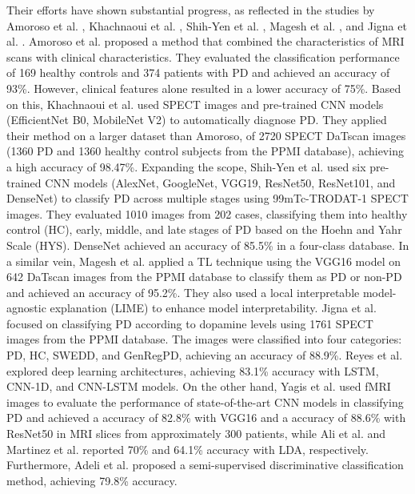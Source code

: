 \documentclass[twocolumn]{article}
\begin{document}
Their efforts have shown substantial progress, as reflected in the studies by Amoroso et al. \cite{amoroso2018complex}, Khachnaoui et al. \cite{khachnaoui2023enhanced}, Shih-Yen et al. \cite{hsu2020classification}, Magesh et al. \cite{magesh2020explainable}, and Jigna et al. \cite{hathaliya2022convolutional}. Amoroso et al. \cite{amoroso2018complex} proposed a method that combined the characteristics of MRI scans with clinical characteristics. They evaluated the classification performance of 169 healthy controls and 374 patients with PD and achieved an accuracy of 93\%. However, clinical features alone resulted in a lower accuracy of 75\%. Based on this, Khachnaoui et al. \cite{khachnaoui2023enhanced} used SPECT images and pre-trained CNN models (EfficientNet B0, MobileNet V2) to automatically diagnose PD. They applied their method on a larger dataset than Amoroso, of 2720 SPECT DaTscan images (1360 PD and 1360 healthy control subjects from the PPMI database), achieving a high accuracy of 98.47\%. Expanding the scope, Shih-Yen et al. \cite{hsu2020classification} used six pre-trained CNN models (AlexNet, GoogleNet, VGG19, ResNet50, ResNet101, and DenseNet) to classify PD across multiple stages using 99mTc-TRODAT-1 SPECT images. They evaluated 1010 images from 202 cases, classifying them into healthy control (HC), early, middle, and late stages of PD based on the Hoehn and Yahr Scale (HYS). DenseNet achieved an accuracy of 85.5\% in a four-class database. In a similar vein, Magesh et al. \cite{magesh2020explainable} applied a TL technique using the VGG16 model on 642 DaTscan images from the PPMI database to classify them as PD or non-PD and achieved an accuracy of 95.2\%. They also used a local interpretable model-agnostic explanation (LIME) to enhance model interpretability. Jigna et al. \cite{hathaliya2022convolutional} focused on classifying PD according to dopamine levels using 1761 SPECT images from the PPMI database. The images were classified into four categories: PD, HC, SWEDD, and GenRegPD, achieving an accuracy of 88.9\%. Reyes et al. \cite{reyes2019lstm} explored deep learning architectures, achieving 83.1\% accuracy with LSTM, CNN-1D, and CNN-LSTM models. On the other hand, Yagis et al. \cite{DBLP:conf/bibm/YagisHC19} used fMRI images to evaluate the performance of state-of-the-art CNN models in classifying PD and achieved a accuracy of 82.8\% with VGG16 and a accuracy of 88.6\% with ResNet50 in MRI slices from approximately 300 patients, while Ali et al. \cite{ali2019multi} and Martinez et al. \cite{martinez2018kinematic} reported 70\% and 64.1\% accuracy with LDA, respectively. Furthermore, Adeli et al. \cite{adeli2018semi} proposed a semi-supervised discriminative classification method, achieving 79.8\% accuracy. 
\end{document}
